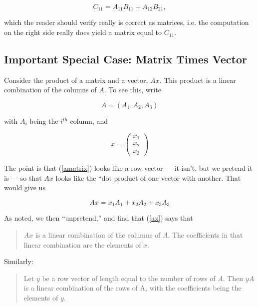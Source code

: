 \begin{equation}
C_{11} = A_{11} B_{11} + A_{12} B_{21}, 
\end{equation}

which the reader should verify really is correct as matrices, i.e. the
computation on the right side really does yield a matrix equal to $C_{11}$.

\subsection{Important Special Case:  Matrix Times Vector}

Consider the product of a matrix and a vector, $Ax$.  This product is a
linear combination of the columns of $A$.  To see this, write

\begin{equation}
\label{amatrix}
A = (A_1, A_2, A_3)
\end{equation}

with $A_i$ being the $i^{th}$ column, and

\begin{equation}
x = 
\left ( 
\begin{array}{c}
x_1 \\
x_2 \\
x_3
\end{array}
\right )
\end{equation}

The point is that (\ref{amatrix}) looks like a row vector --- it isn't,
but we pretend it is --- so that $Ax$ looks like the ``dot product of
one vector with another.  That would give us

\begin{equation}
\label{ax}
Ax = x_1 A_1 + x_2 A_2 + x_3 A_3
\end{equation}

As noted, we then ``unpretend,'' and find that (\ref{ax}) says that

\begin{quote}
$Ax$ is a linear combination of the columns of $A$.  The coefficients in
that linear combination are the elements of $x$.
\end{quote}

Similarly:

\begin{quote}
Let $y$ be a row vector of length equal to the number of rows of $A$.
Then $yA$ is a linear combination of the rows of A, with the
coefficients being the elements of $y$.
\end{quote}

